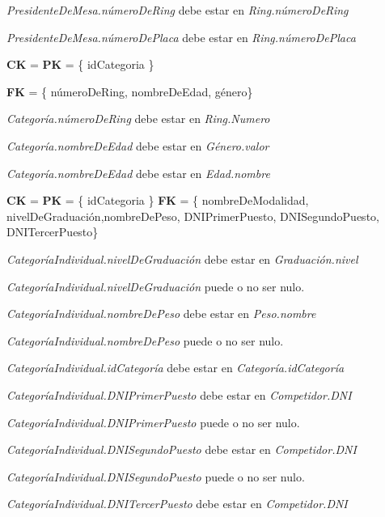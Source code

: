 \textit{PresidenteDeMesa.númeroDeRing} debe estar en \textit{Ring.númeroDeRing}

\textit{PresidenteDeMesa.númeroDePlaca} debe estar en \textit{Ring.númeroDePlaca}\\


\textbf{CK} = \textbf{PK} = \{ idCategoria \}

\textbf{FK} = \{ númeroDeRing, nombreDeEdad, género\}

\textit{Categoría.númeroDeRing} debe estar en \textit{Ring.Numero}

\textit{Categoría.nombreDeEdad} debe estar en \textit{Género.valor}

\textit{Categoría.nombreDeEdad} debe estar en \textit{Edad.nombre}\\


\textbf{CK} = \textbf{PK} = \{ idCategoria \}
\textbf{FK} = \{ nombreDeModalidad, nivelDeGraduación,nombreDePeso, DNIPrimerPuesto, DNISegundoPuesto, DNITercerPuesto\}


\textit{CategoríaIndividual.nivelDeGraduación} debe estar en \textit{Graduación.nivel}

\textit{CategoríaIndividual.nivelDeGraduación} puede o no ser nulo.

\textit{CategoríaIndividual.nombreDePeso} debe estar en \textit{Peso.nombre}

\textit{CategoríaIndividual.nombreDePeso} puede o no ser nulo. 

\textit{CategoríaIndividual.idCategoría} debe estar en \textit{Categoría.idCategoría}

\textit{CategoríaIndividual.DNIPrimerPuesto} debe estar en \textit{Competidor.DNI}

\textit{CategoríaIndividual.DNIPrimerPuesto} puede o no ser nulo.

\textit{CategoríaIndividual.DNISegundoPuesto} debe estar en \textit{Competidor.DNI}

\textit{CategoríaIndividual.DNISegundoPuesto} puede o no ser nulo.

\textit{CategoríaIndividual.DNITercerPuesto} debe estar en \textit{Competidor.DNI}

